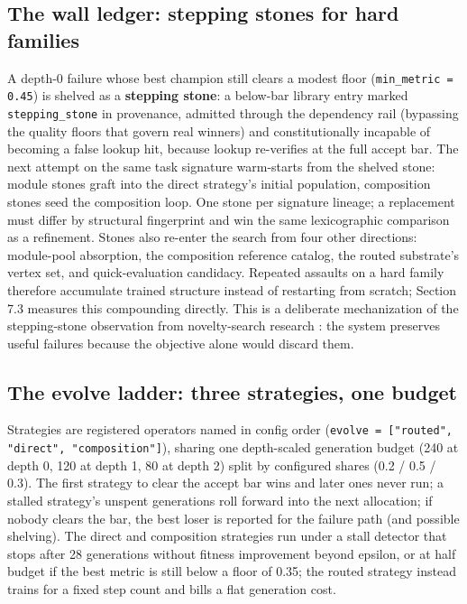 \documentclass[11pt]{article}
\begin{document}
\subsection{The wall ledger: stepping stones for hard families}

A depth-0 failure whose best champion still clears a modest floor (\texttt{min_metric = 0.45}) is shelved as a \textbf{stepping stone}: a below-bar library entry marked \texttt{stepping_stone} in provenance, admitted through the dependency rail (bypassing the quality floors that govern real winners) and constitutionally incapable of becoming a false lookup hit, because lookup re-verifies at the full accept bar. The next attempt on the same task signature warm-starts from the shelved stone: module stones graft into the direct strategy's initial population, composition stones seed the composition loop. One stone per signature lineage; a replacement must differ by structural fingerprint and win the same lexicographic comparison as a refinement. Stones also re-enter the search from four other directions: module-pool absorption, the composition reference catalog, the routed substrate's vertex set, and quick-evaluation candidacy. Repeated assaults on a hard family therefore accumulate trained structure instead of restarting from scratch; Section 7.3 measures this compounding directly. This is a deliberate mechanization of the stepping-stone observation from novelty-search research \citep{lehman2011}: the system preserves useful failures because the objective alone would discard them.

\subsection{The evolve ladder: three strategies, one budget}

Strategies are registered operators named in config order (\texttt{evolve = ["routed",\allowbreak{} "direct",\allowbreak{} "composition"]}), sharing one depth-scaled generation budget (240 at depth 0, 120 at depth 1, 80 at depth 2) split by configured shares (0.2 / 0.5 / 0.3). The first strategy to clear the accept bar wins and later ones never run; a stalled strategy's unspent generations roll forward into the next allocation; if nobody clears the bar, the best loser is reported for the failure path (and possible shelving). The direct and composition strategies run under a stall detector that stops after 28 generations without fitness improvement beyond epsilon, or at half budget if the best metric is still below a floor of 0.35; the routed strategy instead trains for a fixed step count and bills a flat generation cost.
\end{document}
